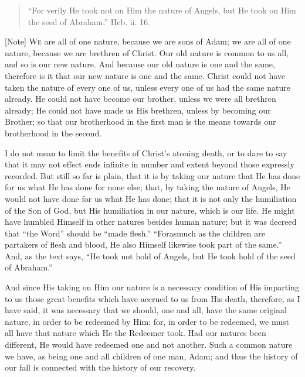 
\begin{quote}

``For verily He took not on Him the nature of Angels, but He
took on Him the seed of Abraham.'' Heb. ii. 16.

\end{quote}

[Note] W\textsc{e} are all of one nature,
because we are sons of Adam; we are all of one nature, because we are
brethren of Christ. Our old nature is common to us all, and so is our
new nature. And because our old nature is one and the same, therefore
is it that our new nature is one and the same. Christ could not have
taken the nature of every one of us, unless every one of us had the
same nature already. He could not have become our brother, unless we
were all brethren already; He could not have made us His brethren,
unless by becoming our Brother; so that our brotherhood in the first
man is the means towards our brotherhood in the second.

I do not mean to limit the benefits of Christ's atoning death, or
to dare to say that it may not effect ends infinite in number and
extent beyond those expressly recorded. But still so far is plain,
that it is by taking our nature that He has done for us what He has
done for none else; that, by taking the nature of Angels, He would not
have done for us what He has done; that it is not only the humiliation
of the Son of God, but His humiliation in our nature, which is our
life. He might have humbled Himself in other natures besides human
nature; but it was decreed that ``the Word'' should be
``made flesh.'' ``Forasmuch as the children are partakers
of flesh and blood, He also Himself likewise took part of the
same.'' And, as the text says, ``He took not hold of Angels,
but He took hold of the seed of Abraham.''

And since His taking on Him our nature is a necessary condition of
His imparting to us those great benefits which have accrued to us from
His death, therefore, as I have said, it was necessary that we should,
one and all, have the same original nature, in order to be redeemed by
Him; for, in order to be redeemed, we must all have that nature which
He the Redeemer took. Had our natures been different, He would have
redeemed one and not another. Such a common nature we have, as being
one and all children of one man, Adam; and thus the history of our
fall is connected with the history of our recovery.

